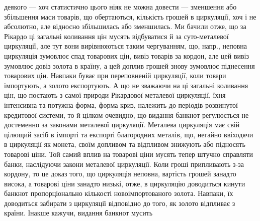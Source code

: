 деякого — хоч статистично цього ніяк не можна довести — зменшення або збільшення
маси товарів, що обертаються, кількість грошей в циркуляції, хоч і не
абсолютно, але відносно збільшилась або зменшилась. Ми бачили отже, що за
Рікардо ці загальні коливання цін мусять відбуватися й за суто-металевої циркуляції,
але тут вони вирівнюються таким чергуванням, що, напр., неповна
циркуляція зумовлює спад товарових цін, вивіз товарів за кордон, але цей вивіз
зумовлює довіз золота в країну, а цей доплив грошей знову зумовлює піднесення
товарових цін. Навпаки буває при переповненій циркуляції, коли товари імпортують,
а золото експортують. А що не зважаючи на ці загальні коливання цін,
що постають з самої природи Рікардової металевої циркуляції, їхня інтенсивна
та потужна форма, форма криз, належить до періодів розвинутої кредитової системи,
то й цілком очевидно, що видання банкнот регулюється не достеменно за законами
металевої циркуляції. Металева циркуляція має свій цілющий засіб в імпорті
та експорті благородних металів, що, негайно ввіходячи в циркуляції як монета,
своїм допливом та відпливом знижують або підносять товарові ціни. Той самий
вплив на товарові ціни мусять тепер штучно справляти банки, наслідуючи закони
металевої циркуляції. Коли гроші припливають з-за кордону, то це доказ того,
що циркуляція неповна, вартість грошей занадто висока, а товарові ціни занадто
низькі, отже, в циркуляцію доводиться кинути банкнот пропорціонально кількості
новоімпортованого золота. Навпаки, їх доводиться забирати з циркуляції відповідно
до того, як золото відпливає з країни. Інакше кажучи, видання банкнот мусить
\parbreak{}  %
